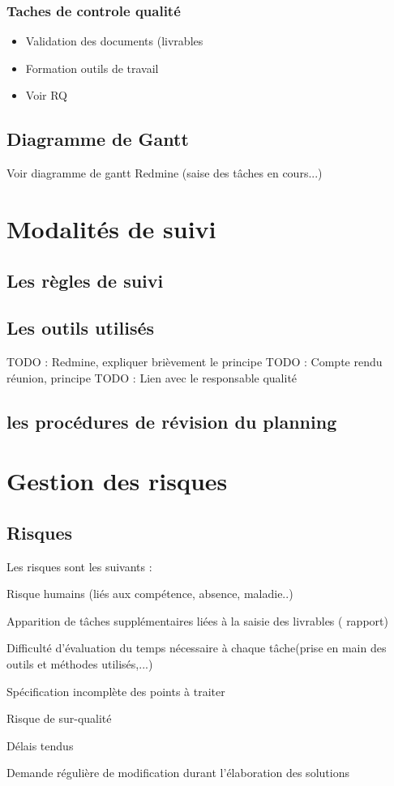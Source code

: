 \subsubsection {Taches de controle qualité}
\begin{itemize}
    \item Validation des documents (livrables
	\item Formation outils de travail
	\item Voir RQ 
\end{itemize}	

\subsection{Diagramme de Gantt}
Voir diagramme de gantt Redmine (saise des tâches en cours...)
\section{Modalités de suivi}
\subsection{Les règles de suivi}
\subsection{Les outils utilisés}
TODO : Redmine, expliquer brièvement le principe
TODO : Compte rendu réunion, principe 
TODO : Lien avec le responsable qualité
\subsection{les procédures de révision du planning}
\section{Gestion des risques}
\subsection{Risques}

\setcounter{risques}{0}

\newcommand{\risque}[1]{
    \addtocounter{risques}{1}
    \item[R\therisques]{\indent#1}
}
Les risques sont les suivants :
\begin{description}
    \risque{Risque humains (liés aux compétence, absence, maladie..)}
    \risque{Apparition de tâches supplémentaires liées à la saisie des livrables ( rapport)}
    \risque{Difficulté d’évaluation du temps nécessaire à chaque tâche(prise en main des outils et méthodes utilisés,...)}
    \risque{Spécification incomplète des points à traiter}
    \risque{Risque de sur-qualité}
    \risque{Délais tendus}
    \risque{Demande régulière de modification durant l’élaboration des solutions}
\end{description}

